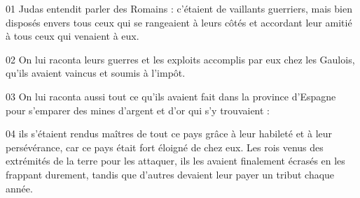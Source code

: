 01 Judas entendit parler des Romains : c’étaient de vaillants guerriers, mais bien disposés envers tous ceux qui se rangeaient à leurs côtés et accordant leur amitié à tous ceux qui venaient à eux.

02 On lui raconta leurs guerres et les exploits accomplis par eux chez les Gaulois, qu’ils avaient vaincus et soumis à l’impôt.

03 On lui raconta aussi tout ce qu’ils avaient fait dans la province d’Espagne pour s’emparer des mines d’argent et d’or qui s’y trouvaient :

04 ils s’étaient rendus maîtres de tout ce pays grâce à leur habileté et à leur persévérance, car ce pays était fort éloigné de chez eux. Les rois venus des extrémités de la terre pour les attaquer, ils les avaient finalement écrasés en les frappant durement, tandis que d’autres devaient leur payer un tribut chaque année.